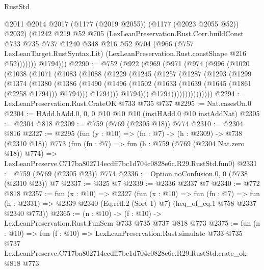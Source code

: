 \begin{lexlean}{RustStd}
\begin{coremodule}
                  @2011
                  @2014
                  @2017
                  (@1177 (@2019 @2055))
                  (@1177 (@2023 @2055 @52))
                  @2032)
                (@1242
                  @219
                  @52
                  @705
                  (LexLeanPreservation.Rust.Corr.buildConst
                    @733
                    @735
                    @737
                    @1240
                    @348
                    @216
                    @52
                    @704
                    (@966
                      (@757 LexLeanTarget.RustSyntax.Lit)
                      (LexLeanPreservation.Rust.constShape @216 @52)))))))
          @1794)))
@2290 := @752
    (@922
      (@969
        (@971
          (@974
            (@996
              (@1020
                (@1038
                  (@1071
                    (@1083
                      (@1088
                        (@1229
                          (@1245
                            (@1257
                              (@1287
                                (@1293
                                  (@1299
                                    (@1374
                                      (@1380
                                        (@1386
                                          (@1490
                                            (@1496
                                              (@1502
                                                (@1633 (@1639 (@1645 (@1861 (@2258 @1794))) @1794)))
                                              @1794)))
                                        @1794)))
                                  @1794)))))))))))))))
@2294 := LexLeanPreservation.Rust.CrateOK @733 @735 @737
@2295 := Nat.casesOn.{0}
@2304 := HAdd.hAdd.{0, 0, 0} @10 @10 @10 (instHAdd.{0} @10 instAddNat)
@2305 := @2304 @818
@2309 := @759 (@769 (@2305 @18)) @774
@2310 := @2304 @816
@2327 := @2295
    (fun (y : @10) => (fn : @7) -> (h : @2309) -> @738 (@2310 @18))
    @773
    (fun (fn : @7) =>
    fun (h : @759 (@769 (@2304 Nat.zero @18)) @774) =>
    LexLeanPreserve.C717ba802714ecdff7bc1d704c0828e6c.R29.RustStd.fun0)
@2331 := @759 (@769 (@2305 @23)) @774
@2336 := Option.noConfusion.{0, 0} (@738 (@2310 @23)) @7
@2337 := @325 @7
@2339 := @2336 @2337 @7
@2340 := @772 @818
@2357 := fun (x : @10) =>
  @2327
    (fun (x : @10) =>
    fun (fn : @7) =>
    fun (h : @2331) => @2339 @2340 (Eq.refl.{2} (Sort 1) @7) (heq_of_eq.{1} @758 @2337 @2340 @773))
@2365 := (n : @10) -> (f : @10) -> LexLeanPreservation.Rust.FunSem @733 @735 @737 @818 @773
@2375 := fun (n : @10) =>
  fun (f : @10) =>
  LexLeanPreservation.Rust.simulate
    @733
    @735
    @737
    LexLeanPreserve.C717ba802714ecdff7bc1d704c0828e6c.R29.RustStd.crate_ok
    @818
    @773
\end{coremodule}
\end{lexlean}
